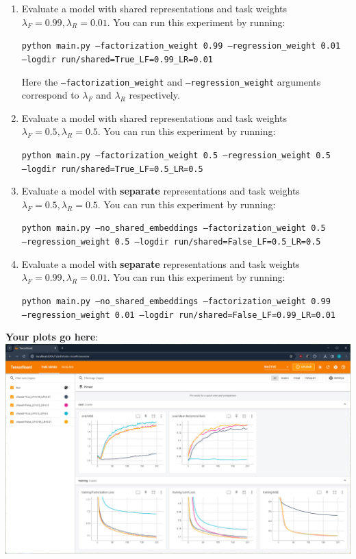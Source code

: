 \documentclass[12pt]{article}
\begin{document}
    \begin{enumerate}
        \item Evaluate a model with shared representations and task weights $\lambda_F=0.99, \lambda_R=0.01$. You can run this experiment by running:

        \texttt{python main.py --factorization\_weight 0.99 --regression\_weight 0.01 \\--logdir run/shared=True\_LF=0.99\_LR=0.01}

        Here the \texttt{--factorization\_weight} and \texttt{--regression\_weight} arguments correspond to $\lambda_F$ and  $\lambda_R$ respectively.

        \item Evaluate a model with shared representations and task weights $\lambda_F=0.5, \lambda_R=0.5$. You can run this experiment by running:

        \texttt{python main.py --factorization\_weight 0.5 --regression\_weight 0.5 \\--logdir run/shared=True\_LF=0.5\_LR=0.5}

        \item Evaluate a model with \textbf{separate} representations and task weights $\lambda_F=0.5, \lambda_R=0.5$. You can run this experiment by running:

        \texttt{python main.py --no\_shared\_embeddings --factorization\_weight 0.5 \\ --regression\_weight 0.5 --logdir run/shared=False\_LF=0.5\_LR=0.5}

        \item Evaluate a model with \textbf{separate} representations and task weights $\lambda_F=0.99, \lambda_R=0.01$. You can run this experiment by running:

        \texttt{python main.py --no\_shared\_embeddings --factorization\_weight 0.99 \\ --regression\_weight 0.01 --logdir run/shared=False\_LF=0.99\_LR=0.01}

    \end{enumerate}

    \noindent\textbf{Your plots go here}:\\
    \includegraphics[width=\textwidth]{.png}
\end{document}
